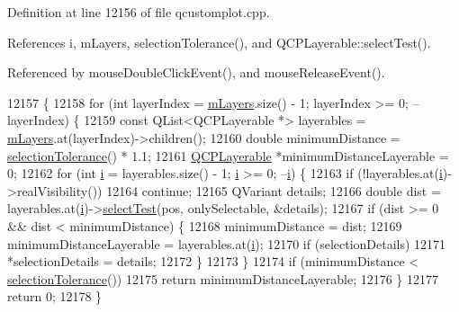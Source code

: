 Definition at line 12156 of file qcustomplot.\+cpp.



References i, m\+Layers, selection\+Tolerance(), and Q\+C\+P\+Layerable\+::select\+Test().



Referenced by mouse\+Double\+Click\+Event(), and mouse\+Release\+Event().


\begin{DoxyCode}
12157                                                                          \{
12158   \textcolor{keywordflow}{for} (\textcolor{keywordtype}{int} layerIndex = \hyperlink{class_q_custom_plot_a9685e7ec1ef5e6066dd7d91bb3a698b3}{mLayers}.size() - 1; layerIndex >= 0; --layerIndex) \{
12159     \textcolor{keyword}{const} QList<QCPLayerable *> layerables = \hyperlink{class_q_custom_plot_a9685e7ec1ef5e6066dd7d91bb3a698b3}{mLayers}.at(layerIndex)->children();
12160     \textcolor{keywordtype}{double} minimumDistance = \hyperlink{class_q_custom_plot_a7b738074c75e80070ef6a10263c6cd69}{selectionTolerance}() * 1.1;
12161     \hyperlink{class_q_c_p_layerable}{QCPLayerable} *minimumDistanceLayerable = 0;
12162     \textcolor{keywordflow}{for} (\textcolor{keywordtype}{int} \hyperlink{_comparision_pictures_2_createtest_image_8m_a6f6ccfcf58b31cb6412107d9d5281426}{i} = layerables.size() - 1; \hyperlink{_comparision_pictures_2_createtest_image_8m_a6f6ccfcf58b31cb6412107d9d5281426}{i} >= 0; --\hyperlink{_comparision_pictures_2_createtest_image_8m_a6f6ccfcf58b31cb6412107d9d5281426}{i}) \{
12163       \textcolor{keywordflow}{if} (!layerables.at(\hyperlink{_comparision_pictures_2_createtest_image_8m_a6f6ccfcf58b31cb6412107d9d5281426}{i})->realVisibility())
12164         \textcolor{keywordflow}{continue};
12165       QVariant details;
12166       \textcolor{keywordtype}{double} dist = layerables.at(\hyperlink{_comparision_pictures_2_createtest_image_8m_a6f6ccfcf58b31cb6412107d9d5281426}{i})->\hyperlink{class_q_c_p_layerable_a4001c4d0dfec55598efa4d531f2179a9}{selectTest}(pos, onlySelectable, &details);
12167       \textcolor{keywordflow}{if} (dist >= 0 && dist < minimumDistance) \{
12168         minimumDistance = dist;
12169         minimumDistanceLayerable = layerables.at(\hyperlink{_comparision_pictures_2_createtest_image_8m_a6f6ccfcf58b31cb6412107d9d5281426}{i});
12170         \textcolor{keywordflow}{if} (selectionDetails)
12171           *selectionDetails = details;
12172       \}
12173     \}
12174     \textcolor{keywordflow}{if} (minimumDistance < \hyperlink{class_q_custom_plot_a7b738074c75e80070ef6a10263c6cd69}{selectionTolerance}())
12175       \textcolor{keywordflow}{return} minimumDistanceLayerable;
12176   \}
12177   \textcolor{keywordflow}{return} 0;
12178 \}
\end{DoxyCode}


